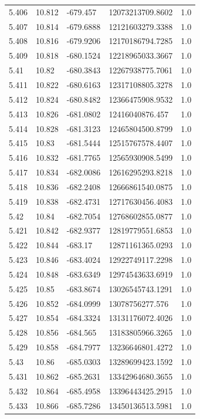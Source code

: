 \begin{tabular}{lllll}
5.406 & 10.812 & -679.457 & 12073213709.8602 & 1.0 \\
5.407 & 10.814 & -679.6888 & 12121603279.3388 & 1.0 \\
5.408 & 10.816 & -679.9206 & 12170186794.7285 & 1.0 \\
5.409 & 10.818 & -680.1524 & 12218965033.3667 & 1.0 \\
5.41 & 10.82 & -680.3843 & 12267938775.7061 & 1.0 \\
5.411 & 10.822 & -680.6163 & 12317108805.3278 & 1.0 \\
5.412 & 10.824 & -680.8482 & 12366475908.9532 & 1.0 \\
5.413 & 10.826 & -681.0802 & 12416040876.457 & 1.0 \\
5.414 & 10.828 & -681.3123 & 12465804500.8799 & 1.0 \\
5.415 & 10.83 & -681.5444 & 12515767578.4407 & 1.0 \\
5.416 & 10.832 & -681.7765 & 12565930908.5499 & 1.0 \\
5.417 & 10.834 & -682.0086 & 12616295293.8218 & 1.0 \\
5.418 & 10.836 & -682.2408 & 12666861540.0875 & 1.0 \\
5.419 & 10.838 & -682.4731 & 12717630456.4083 & 1.0 \\
5.42 & 10.84 & -682.7054 & 12768602855.0877 & 1.0 \\
5.421 & 10.842 & -682.9377 & 12819779551.6853 & 1.0 \\
5.422 & 10.844 & -683.17 & 12871161365.0293 & 1.0 \\
5.423 & 10.846 & -683.4024 & 12922749117.2298 & 1.0 \\
5.424 & 10.848 & -683.6349 & 12974543633.6919 & 1.0 \\
5.425 & 10.85 & -683.8674 & 13026545743.1291 & 1.0 \\
5.426 & 10.852 & -684.0999 & 13078756277.576 & 1.0 \\
5.427 & 10.854 & -684.3324 & 13131176072.4026 & 1.0 \\
5.428 & 10.856 & -684.565 & 13183805966.3265 & 1.0 \\
5.429 & 10.858 & -684.7977 & 13236646801.4272 & 1.0 \\
5.43 & 10.86 & -685.0303 & 13289699423.1592 & 1.0 \\
5.431 & 10.862 & -685.2631 & 13342964680.3655 & 1.0 \\
5.432 & 10.864 & -685.4958 & 13396443425.2915 & 1.0 \\
5.433 & 10.866 & -685.7286 & 13450136513.5981 & 1.0 \\

\end{tabular}
